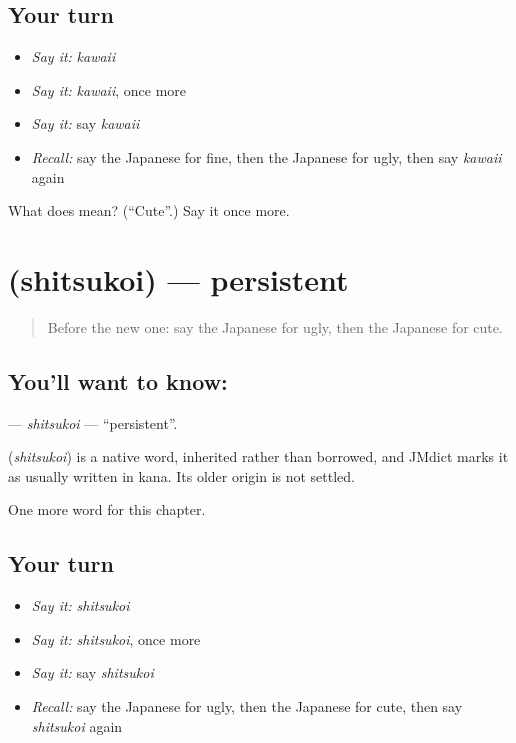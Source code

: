 \subsection*{Your turn}
\begin{itemize}
\raggedright
  \item \emph{Say it:} \emph{kawaii}
  \item \emph{Say it:} \emph{kawaii}, once more
  \item \emph{Say it:} say \emph{kawaii}
  \item \emph{Recall:} say the Japanese for fine, then the Japanese for ugly, then say \emph{kawaii} again
\end{itemize}

\begin{tcolorbox}[breakable,colback=teal!4,colframe=teal!35!black,title={Before you move on}]
What does  mean? (\textquotedblleft{}Cute\textquotedblright{}.) Say it once more.
\end{tcolorbox}
\section[\texorpdfstring{\ja{しつこい} (shitsukoi)}{しつこい (shitsukoi)}]{ (shitsukoi) — persistent}

\label{lesson:JA-C129-shitsukoi}



\begin{quote}
Before the new one: say the Japanese for ugly, then the Japanese for cute.
\end{quote}

\subsection*{You'll want to know: }
\textbf{} — \emph{shitsukoi} — \textquotedblleft{}persistent\textquotedblright{}.

\begin{cousinweb}
\textbf{} (\emph{shitsukoi}) is a native word, inherited rather than borrowed, and JMdict marks it as usually written in kana. Its older origin is not settled.
\end{cousinweb}

\begin{grammarlens}[title={What you've built}]
One more word for this chapter.
\end{grammarlens}

\subsection*{Your turn}
\begin{itemize}
\raggedright
  \item \emph{Say it:} \emph{shitsukoi}
  \item \emph{Say it:} \emph{shitsukoi}, once more
  \item \emph{Say it:} say \emph{shitsukoi}
  \item \emph{Recall:} say the Japanese for ugly, then the Japanese for cute, then say \emph{shitsukoi} again
\end{itemize}

